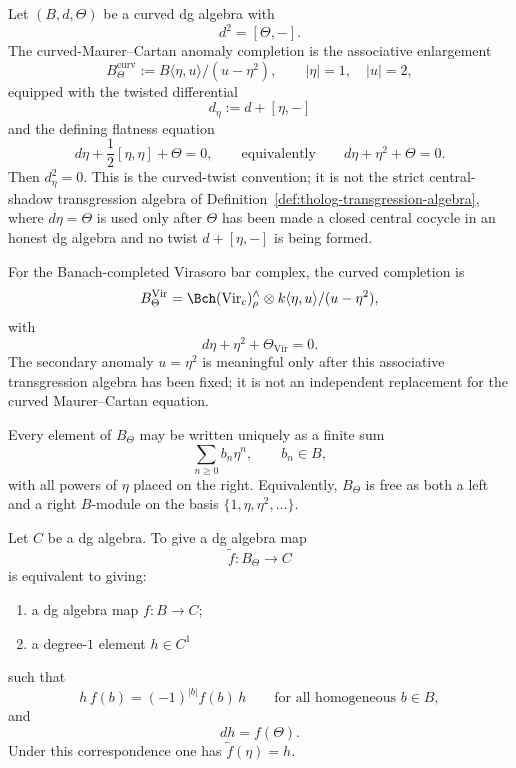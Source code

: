 \begin{definition}
\label{def:tholog-curved-mc-anomaly-completion}
Let \((B,d,\Theta)\) be a curved dg algebra with
\[
d^{2}=[\Theta,-].
\]
The curved-Maurer--Cartan anomaly completion is the associative
enlargement
\[
B_{\Theta}^{\mathrm{curv}}
:=
B\langle\eta,u\rangle/(u-\eta^{2}),
\qquad |\eta|=1,\quad |u|=2,
\]
equipped with the twisted differential
\[
d_{\eta}:=d+[\eta,-]
\]
and the defining flatness equation
\begin{equation}\label{eq:curved-mc-anomaly-completion}
d\eta+\frac12[\eta,\eta]+\Theta=0,
\qquad\text{equivalently}\qquad
d\eta+\eta^{2}+\Theta=0.
\end{equation}
Then \(d_{\eta}^{2}=0\). This is the curved-twist convention; it is
not the strict central-shadow transgression algebra of
Definition~\ref{def:tholog-transgression-algebra}, where \(d\eta=\Theta\)
is used only after \(\Theta\) has been made a closed central cocycle in
an honest dg algebra and no twist \(d+[\eta,-]\) is being formed.
\end{definition}

\begin{example}
\label{ex:virasoro-curved-mc-anomaly-completion}
For the Banach-completed Virasoro bar complex, the curved completion is
\[
B_{\Theta}^{\mathrm{Vir}}
=
\Bch(\mathrm{Vir}_{c})^{\wedge}_{\rho}
\otimes k\langle\eta,u\rangle/(u-\eta^{2}),
\]
with
\[
d\eta+\eta^{2}+\Theta_{\mathrm{Vir}}=0.
\]
The secondary anomaly \(u=\eta^{2}\) is meaningful only after this
associative transgression algebra has been fixed; it is not an
independent replacement for the curved Maurer--Cartan equation.
\end{example}

\begin{remark}
\label{rem:tholog-normal-form}
Every element of \(B_{\Theta}\) may be written uniquely as a finite sum
\[
\sum_{n\geq 0} b_{n}\eta^{n},
\qquad b_{n}\in B,
\]
with all powers of \(\eta\) placed on the right.
Equivalently, \(B_{\Theta}\) is free as both a left and a right \(B\)-module on the basis \(\{1,\eta,\eta^{2},\dots\}\).
\end{remark}

\begin{proposition}
\label{prop:tholog-universal-property}
Let \(C\) be a dg algebra.
To give a dg algebra map
\[
\widetilde f:B_{\Theta}\longrightarrow C
\]
is equivalent to giving:
\begin{enumerate}
\item a dg algebra map \(f:B\to C\);
\item a degree-\(1\) element \(h\in C^{1}\)
\end{enumerate}
such that
\[
h\,f(b)=(-1)^{|b|}f(b)\,h
\qquad \text{for all homogeneous } b\in B,
\]
and
\[
dh=f(\Theta).
\]
Under this correspondence one has \(\widetilde f(\eta)=h\).
\end{proposition}

